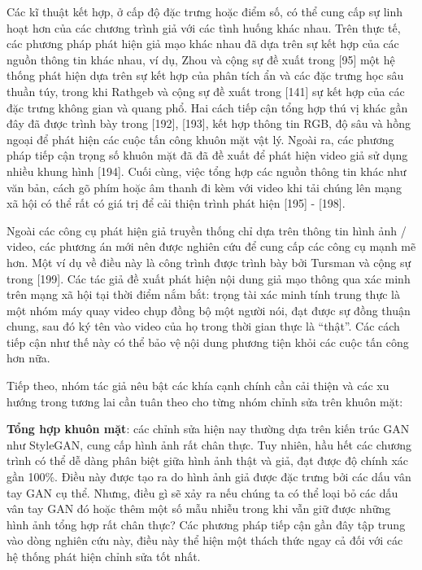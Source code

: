 \documentclass{article}
\begin{document}
Các kĩ thuật kết hợp, ở cấp độ đặc trưng hoặc điểm số, có thể cung cấp sự linh hoạt hơn của các chương trình giả với các tình huống khác nhau. Trên thực tế, các phương pháp phát hiện giả mạo khác nhau đã dựa trên sự kết hợp của các nguồn thông tin khác nhau, ví dụ, Zhou và cộng sự đề xuất trong [95] một hệ thống phát hiện dựa trên sự kết hợp của phân tích ẩn và các đặc trưng học sâu thuần túy, trong khi Rathgeb và cộng sự đề xuất trong [141] sự kết hợp của các đặc trưng không gian và quang phổ. Hai cách tiếp cận tổng hợp thú vị khác gần đây đã được trình bày trong [192], [193], kết hợp thông tin RGB, độ sâu và hồng ngoại để phát hiện các cuộc tấn công khuôn mặt vật lý. Ngoài ra, các phương pháp tiếp cận trọng số khuôn mặt đã đã đề xuất để phát hiện video giả sử dụng nhiều khung hình [194]. Cuối cùng, việc tổng hợp các nguồn thông tin khác như văn bản, cách gõ phím hoặc âm thanh đi kèm với video khi tải chúng lên mạng xã hội có thể rất có giá trị để cải thiện trình phát hiện [195] - [198].

Ngoài các công cụ phát hiện giả truyền thống chỉ dựa trên thông tin hình ảnh / video, các phương án mới nên được nghiên cứu để cung cấp các công cụ mạnh mẽ hơn. Một ví dụ về điều này là công trình được trình bày bởi Tursman và cộng sự trong [199]. Các tác giả đề xuất phát hiện nội dung giả mạo thông qua xác minh trên mạng xã hội tại thời điểm nắm bắt: trọng tài xác minh tính trung thực là một nhóm máy quay video chụp đồng bộ một người nói, đạt được sự đồng thuận chung, sau đó ký tên vào video của họ trong thời gian thực là “thật”. Các cách tiếp cận như thế này có thể bảo vệ nội dung phương tiện khỏi các cuộc tấn công hơn nữa.

Tiếp theo, nhóm tác giả nêu bật các khía cạnh chính cần cải thiện và các xu hướng trong tương lai cần tuân theo cho từng nhóm chỉnh sửa trên khuôn mặt:

\textbf{Tổng hợp khuôn mặt}: các chỉnh sửa hiện nay thường dựa trên kiến trúc GAN như StyleGAN, cung cấp hình ảnh rất chân thực. Tuy nhiên, hầu hết các chương trình có thể dễ dàng phân biệt giữa hình ảnh thật và giả, đạt được độ chính xác gần 100\%. Điều này được tạo ra do hình ảnh giả được đặc trưng bởi các dấu vân tay GAN cụ thể. Nhưng, điều gì sẽ xảy ra nếu chúng ta có thể loại bỏ các dấu vân tay GAN đó hoặc thêm một số mẫu nhiễu trong khi vẫn giữ được những hình ảnh tổng hợp rất chân thực? Các phương pháp tiếp cận gần đây tập trung vào dòng nghiên cứu này, điều này thể hiện một thách thức ngay cả đối với các hệ thống phát hiện chỉnh sửa tốt nhất.
\end{document}
